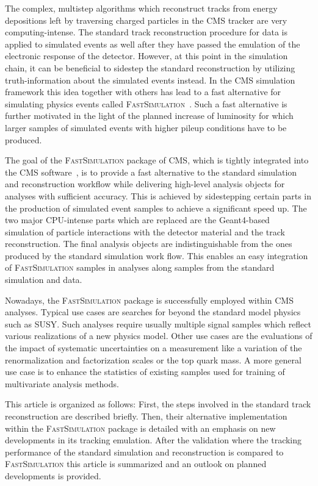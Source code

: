 \documentclass[a4paper]{jpconf}
\begin{document}
The complex, multistep algorithms which reconstruct tracks from energy depositions left by traversing charged particles in the CMS tracker are very computing-intense. The standard track reconstruction procedure for data is applied to simulated events as well after they have passed the emulation of the electronic response of the detector. However, at this point in the simulation chain, it can be beneficial to sidestep the standard reconstruction by utilizing truth-information about the simulated events instead. In the CMS simulation framework this idea together with others has lead to a fast alternative for simulating physics events called \textsc{FastSimulation}~\cite{fsim1,fsim2,fsim3}. Such a fast alternative is further motivated in the light of the planned increase of luminosity for which larger samples of simulated events with higher pileup conditions have to be produced.

The goal of the \textsc{FastSimulation} package of CMS, which is tightly integrated into the CMS software~\cite{cmssw}, is to provide a fast alternative to the standard simulation and reconstruction workflow while delivering high-level analysis objects for analyses with sufficient accuracy. This is achieved by sidestepping certain parts in the production of simulated event samples to achieve a significant speed up. The two major CPU-intense parts which are replaced are the Geant4-based~\cite{geant4} simulation of particle interactions with the detector material and the track reconstruction. The final analysis objects are indistinguishable from the ones produced by the standard simulation work flow. This enables an easy integration of \textsc{FastSimulation} samples in analyses along samples from the standard simulation and data.

Nowadays, the \textsc{FastSimulation} package is successfully employed within CMS analyses. Typical use cases are searches for beyond the standard model physics such as SUSY. Such analyses require usually multiple signal samples which reflect various realizations of a new physics model. Other use cases are the evaluations of the impact of systematic uncertainties on a measurement like a variation of the renormalization and factorization scales or the top quark mass. A more general use case is to enhance the statistics of existing samples used for training of multivariate analysis methods.

This article is organized as follows: First, the steps involved in the standard track reconstruction are described briefly. Then, their alternative implementation within the \textsc{FastSimulation} package is detailed with an emphasis on new developments in its tracking emulation. After the validation where the tracking performance of the standard simulation and reconstruction is compared to \textsc{FastSimulation} this article is summarized and an outlook on planned developments is provided.
\end{document}
